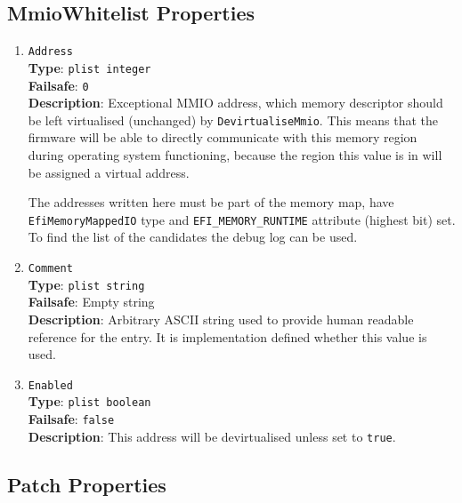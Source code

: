 \documentclass[]{article}
\begin{document}
\subsection{MmioWhitelist Properties}\label{booterpropsmmio}

\begin{enumerate}

\item
  \texttt{Address}\\
  \textbf{Type}: \texttt{plist\ integer}\\
  \textbf{Failsafe}: \texttt{0}\\
  \textbf{Description}: Exceptional MMIO address, which memory descriptor should be left
  virtualised (unchanged) by \texttt{DevirtualiseMmio}. This means that the firmware will
  be able to directly communicate with this memory region during operating system functioning,
  because the region this value is in will be assigned a virtual address.

  The addresses written here must be part of the memory map, have \texttt{EfiMemoryMappedIO}
  type and \texttt{EFI\_MEMORY\_RUNTIME} attribute (highest bit) set. To find the list of the
  candidates the debug log can be used.

\item
  \texttt{Comment}\\
  \textbf{Type}: \texttt{plist\ string}\\
  \textbf{Failsafe}: Empty string\\
  \textbf{Description}: Arbitrary ASCII string used to provide human readable
  reference for the entry. It is implementation defined whether this value is
  used.

\item
  \texttt{Enabled}\\
  \textbf{Type}: \texttt{plist\ boolean}\\
  \textbf{Failsafe}: \texttt{false}\\
  \textbf{Description}: This address will be devirtualised unless set to \texttt{true}.

\end{enumerate}

\subsection{Patch Properties}\label{booterpropspatch}
\end{document}
